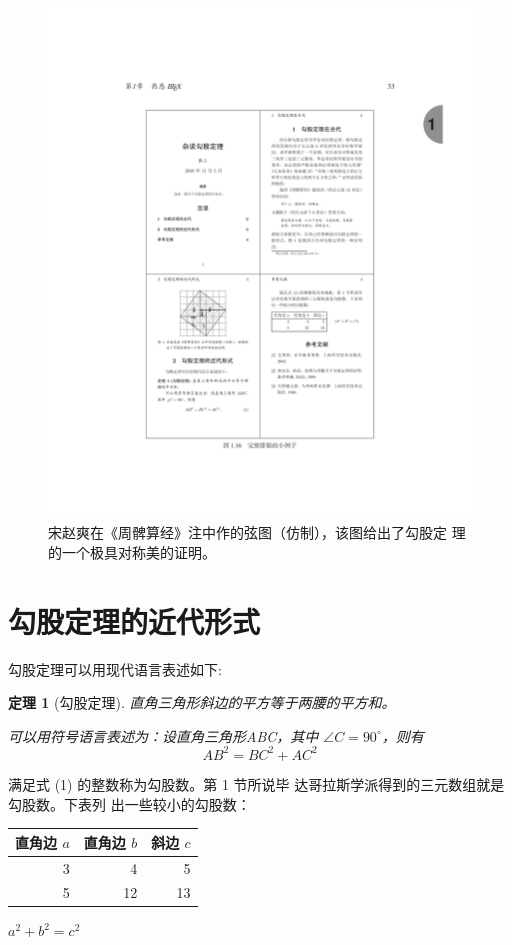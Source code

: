 \documentclass[fontset=windows, 12pt]{article}
\newtheorem{thm}{定理}
\newcommand\degree{^\circ}
\begin{document}
\begin{figure}[ht]
	\centering
	\includegraphics[scale=2]{xiantu.pdf}
	\caption{宋赵爽在《周髀算经》注中作的弦图（仿制），该图给出了勾股定
	理的一个极具对称美的证明。}
	\label{fig:xiantu}
\end{figure}

\section{勾股定理的近代形式}
勾股定理可以用现代语言表述如下:

\begin{thm}[勾股定理]
	直角三角形斜边的平方等于两腰的平方和。

	可以用符号语言表述为：设直角三角形ABC，其中
	$ \angle C = 90\degree $，则有
	\begin{equation}
		AB^2 = BC^2 + AC^2
	\end{equation}
\end{thm}
满足式 (1) 的整数称为勾股数。第 1 节所说毕
达哥拉斯学派得到的三元数组就是勾股数。下表列
出一些较小的勾股数：
\begin{table}[H]
	\begin{tabular}{|r|r|r|}
		\hline
		直角边 $a$ & 直角边 $b$ & 斜边 $c$ \\
		\hline
		3 & 4  & 5 \\
		5 & 12 & 13 \\
		\hline
	\end{tabular}	%
	\qquad
	$a^2 + b^2 = c^2$
\end{table}
\nocite{Shiye}

\end{document}
